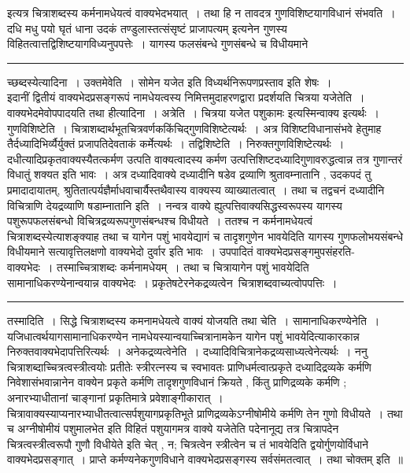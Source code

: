 \documentclass[11pt, openany]{book}
\begin{document}
{  इत्यत्र चित्राशब्दस्य कर्मनामधेयत्वं वाक्यभेदभयात्~। तथा हि न तावदत्र गुणविशिष्टयागविधानं संभवति~। {\qtl दधि मधु पयो घृतं धाना उदकं तण्डुलास्तत्संसृष्टं प्राजापत्यम्}  इत्यनेन गुणस्य विहितत्वात्तद्विशिष्टयागविध्यनुपपत्तेः~। यागस्य फलसंबन्धे गुणसंबन्धे च विधीयमाने }\\
\hrule
\vspace{3mm}
\noindent
{\br च्छब्दस्येत्यादिना~। उक्तमेवेति~।} {\qt सोमेन यजेत} इति विध्यर्थनिरूपणप्रस्ताव इति शेषः~।\\

 इदानीं द्वितीयं वाक्यभेदप्रसङ्गरूपं नामधेयत्वस्य निमित्तमुदाहरणद्वारा प्रदर्शयति {\br चित्रया यजेतेति~।} वाक्यभेदमेवोपपादयति {\br तथा हीत्यादिना~। अत्रेति~।} {\qt चित्रया यजेत पशुकामः} इत्यस्मिन्वाक्य इत्यर्थः~। {\br गुणविशिष्टेति~।} चित्राशब्दार्थभूतचित्रवर्णककिंचिद्गुणविशिष्टेत्यर्थः~। अत्र  विशिष्टविधानासंभवे हेतुमाह तैर्दध्यादिभिर्व्यैर्युक्तं प्रजापतिदेवताकं कर्मेत्यर्थः~। {\br तद्विशिष्टेति~।} निरुक्तगुणविशिष्टेत्यर्थः~।
दधीत्यादिप्रकृतवाक्यस्यैतत्कर्मण उत्पति  वाक्यत्वादस्य कर्मण उत्पत्तिशिष्टदध्यादिगुणावरुद्धत्वान्न तत्र गुणान्तरं विधातुं  शक्यत इति भावः~। अत्र दध्यादिवाक्ये दध्यादीनि षडेव द्रव्याणि श्रुतावम्नातानि , उदकपदं तु प्रमादादायातम्, श्रुतितात्पर्यज्ञैर्माधवाचार्यैस्तथैवास्य  वाक्यस्य व्याख्यातत्वात्~। तथा च तद्वचनं {\qt दध्यादीनि विचित्राणि
देयद्रव्याणि  षडाम्नातानि} इति~। नन्वत्र वाक्ये ह्युत्पत्तिवाक्यसिद्धस्वरूपस्य यागस्य पशुरूपफलसंबन्धो विचित्रद्रव्यरूपगुणसंबन्धश्च विधीयते~। ततश्च न कर्मनामधेयत्वं चित्राशब्दस्येत्याशङ्क्याह तथा च यागेन पशुं भावयेद्यागं च  तादृशगुणेन भावयेदिति यागस्य गुणफलोभयसंबन्धे विधीयमाने सत्यावृत्तिलक्षणो वाक्यभेदो दुर्वार इति भावः~। उपपादितं वाक्यभेदप्रसङ्गमुपसंहरति-
\newpage
\fancyhead[RE]{[ नामधेयत्वे नि० चतु० ]}
{\bl\noindent
वाक्यभेदः~। तस्माच्चित्राशब्दः कर्मनामधेयम्~। तथा च चित्रायागेन पशुं भावयेदिति सामानाधिकरण्येनान्वयान्न वाक्यभेदः~।  प्रकृतेषटेरनेकद्रव्यत्वेन\footnotemark\ चित्राशब्दवाच्यत्वोपपत्तिः~।}\\
\hrule
\vspace{3mm}
\noindent
{\br तस्मादिति~।} सिद्धे चित्राशब्दस्य कमनामधेयत्वे वाक्यं योजयति {\br तथा चेति~। सामानाधिकरण्येनेति~।} यजिधात्वर्थयागसामानाधिकरण्येन  नामधेयस्यान्वयाच्चित्रानामकेन यागेन पशुं भावयेदित्याकारकान्न निरुक्तवाक्यभेदापत्तिरित्यर्थः~। {\br अनेकद्रव्यत्वेनेति~।} दध्यादिविचित्रानेकद्रव्यसाध्यत्वेनेत्यर्थः~। {\br ननु} चित्राशब्दाच्चित्रत्वस्त्रीत्वयोः प्रतीतेः स्त्रीरत्नस्य च स्वभावतः  प्राणिधर्मत्वात्प्रकृते दध्यादिद्रव्यके कर्मणि निवेशासंभवान्नानेन वाक्येन प्रकृते  कर्मणि तादृशगुणविधानं क्रियते , किंतु प्राणिद्रव्यके कर्मणि ; अनारभ्याधीतानां चाङ्गानां प्रकृतिमात्रे प्रवेशाङ्गीकारात्~। चित्रावाक्यस्याप्यनारभ्याधीतत्वात्सर्पशुयागप्रकृतिभूते प्राणिद्रव्यकेऽग्नीषोमीये कर्मणि तेन गुणो विधीयते~। तथा च  {\qt अग्नीषोमीयं पशुमालभेत}  इति विहितं पशुयागमत्र वाक्ये यजेतेति पदेनानूद्य  तत्र चित्रापदेन चित्रत्वस्त्रीत्वरूपौ गुणौ विधीयेते इति चेत् , न;
चित्रत्वेन स्त्रीत्वेन  च तं भावयेदिति द्वयोर्गुणयोर्विधाने वाक्यभेदप्रसङ्गात्~। प्राप्ते कर्मण्यनेकगुणविधाने वाक्यभेदप्रसङ्गस्य सर्वसंमतत्वात्~। तथा चोक्तम् इति~॥\\
\end{document}
